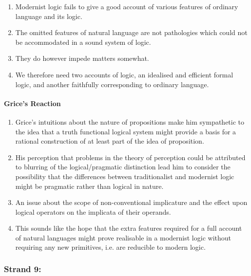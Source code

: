 \documentclass[10pt,titlepage]{book}
\begin{document}
\begin{enumerate}

\item Modernist logic fails to give a good account of various features of ordinary language and its logic.

\item The omitted features of natural language are not pathologies which could not be accommodated in a sound system of logic.

\item They do however impede matters somewhat.

\item We therefore need two accounts of logic, an idealised and efficient formal logic, and another faithfully corresponding to ordinary language. 

\end{enumerate}

\paragraph{Grice's Reaction}

\begin{enumerate}

\item Grice's intuitions about the nature of propositions make him sympathetic to the idea that a truth functional logical system might provide a basis for a rational construction of at least part of the idea of proposition.

\item His perception that problems in the theory of perception could be attributed to blurring of the logical/pragmatic distinction lead him to consider the possibility that the differences between traditionalist and modernist logic might be pragmatic rather than logical in nature.

\item An issue about the scope of non-conventional implicature and the effect upon logical operators on the implicata of their operands.

\item This sounds like the hope that the extra features required for a full account of natural languages might prove realisable in a modernist logic without requiring any new primitives, i.e. are reducible to modern logic.

\end{enumerate}

\subsubsection{Strand 9: }
\end{document}
